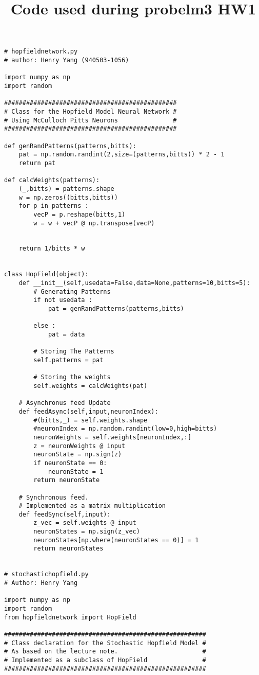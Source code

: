 \documentclass{article}
\title{Code used during probelm3 HW1}
\begin{document}
\maketitle
\begin{verbatim}
# hopfieldnetwork.py
# author: Henry Yang (940503-1056)

import numpy as np
import random

###############################################
# Class for the Hopfield Model Neural Network #
# Using McCulloch Pitts Neurons               #
###############################################

def genRandPatterns(patterns,bitts):
    pat = np.random.randint(2,size=(patterns,bitts)) * 2 - 1
    return pat

def calcWeights(patterns):
    (_,bitts) = patterns.shape 
    w = np.zeros((bitts,bitts))
    for p in patterns :
        vecP = p.reshape(bitts,1)
        w = w + vecP @ np.transpose(vecP)


    return 1/bitts * w


class HopField(object):
    def __init__(self,usedata=False,data=None,patterns=10,bitts=5):
        # Generating Patterns
        if not usedata :
            pat = genRandPatterns(patterns,bitts)

        else :
            pat = data

        # Storing The Patterns
        self.patterns = pat

        # Storing the weights
        self.weights = calcWeights(pat)

    # Asynchronus feed Update
    def feedAsync(self,input,neuronIndex):
        #(bitts,_) = self.weights.shape
        #neuronIndex = np.random.randint(low=0,high=bitts)
        neuronWeights = self.weights[neuronIndex,:]
        z = neuronWeights @ input
        neuronState = np.sign(z)
        if neuronState == 0:
            neuronState = 1
        return neuronState
    
    # Synchronous feed.
    # Implemented as a matrix multiplication
    def feedSync(self,input):
        z_vec = self.weights @ input
        neuronStates = np.sign(z_vec)
        neuronStates[np.where(neuronStates == 0)] = 1
        return neuronStates


# stochastichopfield.py
# Author: Henry Yang

import numpy as np
import random
from hopfieldnetwork import HopField

#######################################################
# Class declaration for the Stochastic Hopfield Model #
# As based on the lecture note.                       #
# Implemented as a subclass of HopField               #
#######################################################


\end{verbatim}
\end{document}
